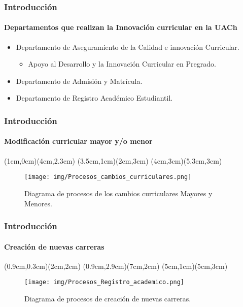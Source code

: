 \documentclass{beamer}
\begin{document}





\begin{frame}
\frametitle{Introducción}
\framesubtitle{Departamentos que realizan la Innovación curricular en la UACh}

\begin{itemize}
	\item Departamento de Aseguramiento de la Calidad e innovación Curricular.
	\begin{itemize}
		\item Apoyo al Desarrollo y la Innovación Curricular en Pregrado.
	\end{itemize}
	\item Departamento de Admisión y Matrícula.
	\item Departamento de Registro Académico Estudiantil.

\end{itemize}
\end{frame}




\begin{frame}  
\frametitle{Introducción}     
    \framesubtitle{Modificación curricular mayor y/o menor}
	(1cm,0cm)(4cm,2.3cm)
	(3.5cm,1cm)(2cm,3cm)
	(4cm,3cm)(5.3cm,3cm) %

    
    \begin{figure}
        \texttt{[image: img/Procesos\_cambios\_curriculares.png]}
        \caption{Diagrama de procesos de los cambios curriculares Mayores y Menores.}
    \end{figure}        
\end{frame} 

\begin{frame}    
\frametitle{Introducción}   
    \framesubtitle{Creación de nuevas carreras}
	(0.9cm,0.3cm)(2cm,2cm)
	(0.9cm,2.9cm)(7cm,2cm)
	(5cm,1cm)(5cm,3cm)
    
    \begin{figure}
        \texttt{[image: img/Procesos\_Registro\_academico.png]}
        \caption{Diagrama de procesos de creación de nuevas carreras.}
    \end{figure}        
\end{frame} 
\end{document}
